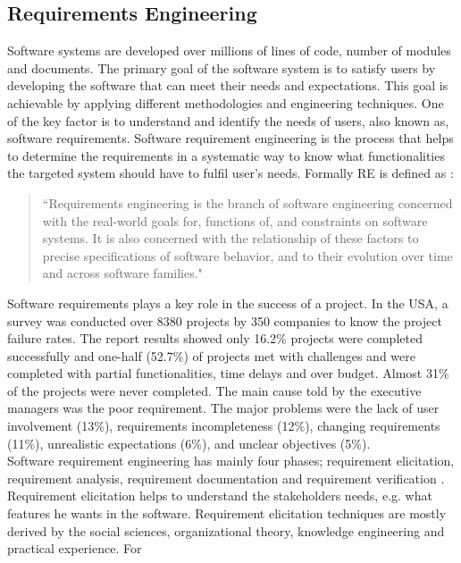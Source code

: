 \subsection{Requirements Engineering}

Software systems are developed over millions of lines of code, number of modules
and documents. The primary goal of the software system is to satisfy users by
developing the software that can meet their needs and expectations. This goal is
achievable by applying different methodologies and engineering techniques. One
of the key factor is to understand and identify the needs of users, also known
as, software requirements. Software requirement engineering is the process that
helps to determine the requirements in a systematic way to know what
functionalities the targeted system should have to fulfil user's needs. Formally
RE is defined as \cite{Zave:1997:CRE:267580.267581}:\\
\begin{quote}
``Requirements engineering is the branch of software engineering concerned with the real-world
goals for, functions of, and constraints on software systems. It is also concerned with the
relationship of these factors to precise specifications of software behavior, and to their evolution
over time and across software families."
\end{quote}
Software requirements plays a key role in the success of a project. In the USA, a
survey was conducted over 8380 projects by 350 companies to know the project
failure rates. The report \cite{StandishReport} results showed only 16.2\% projects were
completed successfully and one-half (52.7\%) of projects met with challenges and
were completed with partial functionalities, time delays and over budget. Almost
31\% of the projects were never completed. The main cause told by the executive
managers was the poor requirement. The major problems were the lack of user
involvement (13\%), requirements incompleteness (12\%), changing requirements
(11\%), unrealistic expectations (6\%), and unclear objectives
(5\%). \\
Software requirement engineering has mainly four phases; requirement
elicitation, requirement analysis, requirement documentation and requirement
verification \cite {Kotonya:1998}. Requirement elicitation
\cite{Coughlan:2002, Zowghi2005} helps to understand the
stakeholders needs, e.g. what features he wants in the software.
Requirement elicitation techniques are mostly derived by the social sciences,
organizational theory, knowledge engineering and practical experience. For
